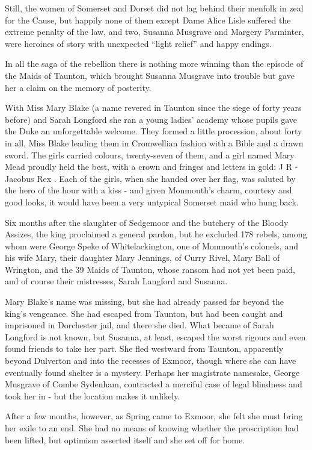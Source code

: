 Still, the women of Somerset and Dorset did not lag behind their menfolk in zeal for the Cause, but happily none of them except Dame Alice Lisle suffered the extreme penalty of the law, and two, Susanna Musgrave and Margery Parminter, were heroines of story with unexpected “light relief” and happy endings.

In all the saga of the rebellion there is nothing more winning than the episode of the Maids of Taunton, which brought Susanna Musgrave into trouble but gave her a claim on the memory of posterity.

With Miss Mary Blake (a name revered in Taunton since the siege of forty years before) and Sarah Longford she ran a young ladies’ academy whose pupils gave the Duke an unforgettable welcome. They formed a little procession, about forty in all, Miss Blake leading them in Cromwellian fashion with a Bible and a drawn sword. The girls carried colours, twenty-seven of them, and a girl named Mary Mead proudly held the best, with a crown and fringes and letters in gold: J R - Jacobus Rex . Each of the girls, when she handed over her flag, was saluted by the hero of the hour with a kiss - and given Monmouth’s charm, courtesy and good looks, it would have been a very untypical Somerset maid who hung back.

Six months after the slaughter of Sedgemoor and the butchery of the Bloody Assizes, the king proclaimed a general pardon, but he excluded 178 rebels, among whom were George Speke of Whitelackington, one of Monmouth’s colonels, and his wife Mary, their daughter Mary Jennings, of Curry Rivel, Mary Ball of Wrington, and the 39 Maids of Taunton, whose ransom had not yet been paid, and of course their mistresses, Sarah Langford and Susanna.

Mary Blake’s name was missing, but she had already passed far beyond the king’s vengeance. She had escaped from Taunton, but had been caught and imprisoned in Dorchester jail, and there she died. What became of Sarah Longford is not known, but Susanna, at least, escaped the worst rigours and even found friends to take her part. She fled westward from Taunton, apparently beyond Dulverton and into the recesses of Exmoor, though where she can have eventually found shelter is a mystery. Perhaps her magistrate namesake, George Musgrave of Combe Sydenham, contracted a merciful case of legal blindness and took her in - but the location makes it unlikely.

After a few months, however, as Spring came to Exmoor, she felt she must bring her exile to an end. She had no means of knowing whether the proscription had been lifted, but optimism asserted itself and she set off for home.

